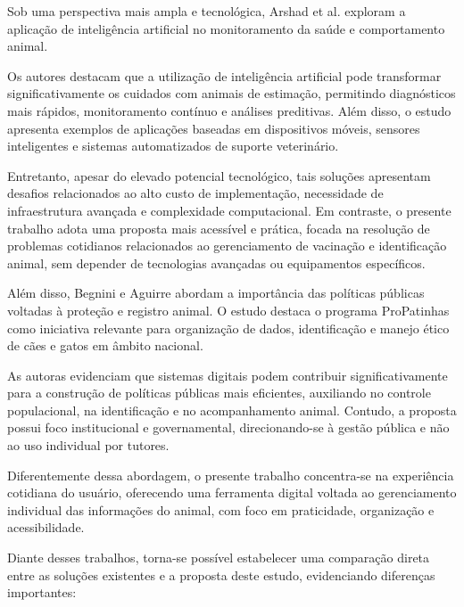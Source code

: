 \documentclass{UNESC}
\begin{document}
Sob uma perspectiva mais ampla e tecnológica, Arshad et al. \cite{arshad2025} exploram a aplicação de inteligência artificial no monitoramento da saúde e comportamento animal.

Os autores destacam que a utilização de inteligência artificial pode transformar significativamente os cuidados com animais de estimação, permitindo diagnósticos mais rápidos, monitoramento contínuo e análises preditivas. Além disso, o estudo apresenta exemplos de aplicações baseadas em dispositivos móveis, sensores inteligentes e sistemas automatizados de suporte veterinário.

Entretanto, apesar do elevado potencial tecnológico, tais soluções apresentam desafios relacionados ao alto custo de implementação, necessidade de infraestrutura avançada e complexidade computacional. Em contraste, o presente trabalho adota uma proposta mais acessível e prática, focada na resolução de problemas cotidianos relacionados ao gerenciamento de vacinação e identificação animal, sem depender de tecnologias avançadas ou equipamentos específicos.

Além disso, Begnini e Aguirre \cite{begnini2025} abordam a importância das políticas públicas voltadas à proteção e registro animal. O estudo destaca o programa ProPatinhas como iniciativa relevante para organização de dados, identificação e manejo ético de cães e gatos em âmbito nacional.

As autoras evidenciam que sistemas digitais podem contribuir significativamente para a construção de políticas públicas mais eficientes, auxiliando no controle populacional, na identificação e no acompanhamento animal. Contudo, a proposta possui foco institucional e governamental, direcionando-se à gestão pública e não ao uso individual por tutores.

Diferentemente dessa abordagem, o presente trabalho concentra-se na experiência cotidiana do usuário, oferecendo uma ferramenta digital voltada ao gerenciamento individual das informações do animal, com foco em praticidade, organização e acessibilidade.

Diante desses trabalhos, torna-se possível estabelecer uma comparação direta entre as soluções existentes e a proposta deste estudo, evidenciando diferenças importantes:
\end{document}

